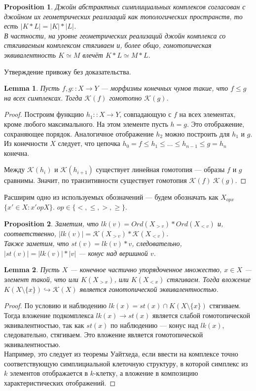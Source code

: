 \documentclass[a4paper, 12pt]{article}
\newtheorem{proposition}{Proposition}
\newtheorem{lemma}{Lemma}
\theoremstyle{definition}
\theoremstyle{remark}
\begin{document}
\begin{proposition}
  Джойн абстрактных симплициальных комплексов согласован с джойном их геометрических реализаций как топологических пространств, то есть $|K * L| = |K| * |L|$.\\
  В частности, на уровне геометрических реализаций джойн комплекса со стягиваемым комплексом стягиваем и, более общо, гомотопическая эквивалентность $K \simeq M$ влечёт $K * L \simeq M * L$.
\end{proposition}
Утверждение привожу без доказательства.\\

\begin{lemma}
  Пусть $f,g :: X \to Y$ --- морфизмы конечных чумов такие, что $f \leqslant g$ на всех симплексах. Тогда $\mathcal{K}(f)$ гомотопно $\mathcal{K}(g)$.
\end{lemma}
\begin{proof}
  Построим функцию $h_1 :: X \to Y$, совпадающую с $f$ на всех элементах, кроме любого максимального. На этом элементе пусть $h = g$. Это отображение, сохраняющее порядок. Аналогичное отображение $h_2$ можно построить для $h_1$ и $g$.
  Из конечности $X$ следует, что цепочка $h_0 = f \leqslant h_1 \leqslant \ldots \leqslant h_{n-1} \leqslant g = h_n$ конечна.

  Между $\mathcal{K}(h_i)$ и $\mathcal{K}(h_{i+1})$ существует линейная гомотопия --- образы $f$ и $g$ сравнимы. Значит, по транзитивности существует гомотопия $\mathcal{K}(f) ~ \mathcal{K}(g)$.
\end{proof}

Расширим одно из используемых обозначений ---  будем обозначать как $X_{op x}$ $\{x' \in X: x' op X\}$. $op \in \{<, \leqslant, >, \geqslant\}$.

\begin{proposition}
  Заметим, что $lk(v) = Ord(X_{>v}) * Ord(X_{<v})$ и, соответственно, $|lk(v)| = \mathcal{K}(X_{>v}) * \mathcal{K}(X_{<v})$.\\
  Также заметим, что $st(v) = lk(v) * v$, следовательно, $|st(v)| = |lk(v)| * |v|$ --- конус над вершиной $v$.
\end{proposition}

\begin{lemma}
  Пусть $X$ --- конечное частично упорядоченное множество, $x \in X$ --- элемент такой, что или $K(X_{>x})$, или $K(X_{<x})$ стягиваем. Тогда вложение $K(X\setminus\{x\}) \hookrightarrow \mathcal{K}(X)$ является гомотопической эквивалентностью.
\end{lemma}
\begin{proof}
  По условию и наблюдению $lk(x) = st(x) \cap K(X \setminus \{x\})$ стягиваем. Тогда вложение подкомплекса $lk(x) \to st(x)$ является слабой гомотопической эквивалентностью, так как $st(x)$ по наблюдению --- конус над $lk(x)$, следовательно, стягиваем. Это вложение является гомотопической эквивалентностью.\\
  Например, это следует из теоремы Уайтхеда, если ввести на комплексе точно соответствующую симплициальной клеточную структуру, в которой симплекс из $k$ элементов отображается в $k$-клетку, а вложение в композицию характеристических отображений.
\end{proof}
\end{document}
